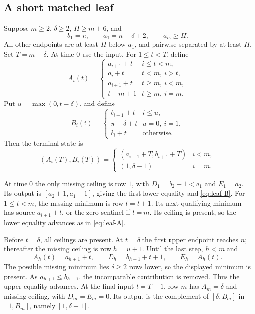 \subsection{A short matched leaf}\label{app:leaf}
Suppose $m\ge2$, $\delta\ge2$, $H\ge m+6$, and
\[
 b_1=n,\qquad a_1=n-\delta+2,\qquad a_m\ge H.
\]
All other endpoints are at least $H$ below $a_1$, and pairwise separated by at least $H$. Set $T=m+\delta$. At time $0$ use the input. For $1\le t<T$, define
\begin{equation}\label{eq:leaf-A}
 A_i(t)=\begin{cases}
 a_{i+1}+t&i\le t<m,\\
 a_i+t&t<m,\ i>t,\\
 a_{i+1}+t&t\ge m,\ i<m,\\
 t-m+1&t\ge m,\ i=m.
 \end{cases}
\end{equation}
Put $u=\max(0,t-\delta)$, and define
\begin{equation}\label{eq:leaf-B}
 B_i(t)=\begin{cases}
 b_{i+1}+t&i\le u,\\
 n-\delta+t&u=0,\ i=1,\\
 b_i+t&\text{otherwise}.
 \end{cases}
\end{equation}
Then the terminal state is
\begin{equation}\label{eq:leaf-terminal}
 (A_i(T),B_i(T))=
 \begin{cases}(a_{i+1}+T,b_{i+1}+T)&i<m,\\(1,\delta-1)&i=m.
 \end{cases}
\end{equation}

At time $0$ the only missing ceiling is row $1$, with $D_1=b_2+1<a_1$ and $E_1=a_2$. Its output is $[a_2+1,a_1-1]$, giving the first lower equality and \eqref{eq:leaf-B}. For $1\le t<m$, the missing minimum is row $l=t+1$. Its next qualifying minimum has source $a_{l+1}+t$, or the zero sentinel if $l=m$. Its ceiling is present, so the lower equality advances as in \eqref{eq:leaf-A}.

Before $t=\delta$, all ceilings are present. At $t=\delta$ the first upper endpoint reaches $n$; thereafter the missing ceiling is row $h=u+1$. Until the last step, $h<m$ and
\[
 A_h(t)=a_{h+1}+t,\qquad D_h=b_{h+1}+t+1,\qquad E_h=A_h(t).
\]
The possible missing minimum lies $\delta\ge2$ rows lower, so the displayed minimum is present. As $a_{h+1}\le b_{h+1}$, the incomparable contribution is removed. Thus the upper equality advances. At the final input $t=T-1$, row $m$ has $A_m=\delta$ and missing ceiling, with $D_m=E_m=0$. Its output is the complement of $[\delta,B_m]$ in $[1,B_m]$, namely $[1,\delta-1]$.

